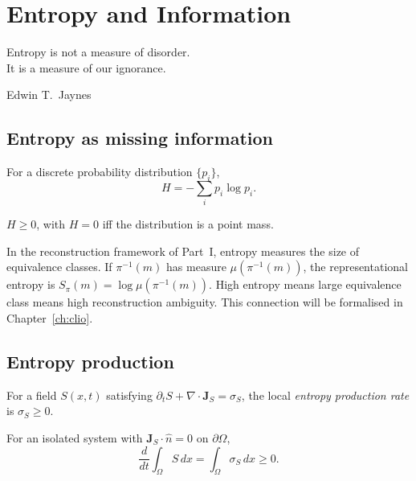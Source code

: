 
\chapter{Entropy and Information}
\label{ch:entropy}

\epigraph{%
  Entropy is not a measure of disorder.\\
  It is a measure of our ignorance.%
}{Edwin T.\ Jaynes}

\section{Entropy as missing information}

\begin{definition}
  For a discrete probability distribution $\{p_i\}$,
  \[
    H = -\sum_i p_i \log p_i.
  \]
\end{definition}

\begin{proposition}
  $H \geq 0$, with $H = 0$ iff the distribution is a point mass.
\end{proposition}

\begin{TechNote}
  In the reconstruction framework of Part~I, entropy measures
  the size of equivalence classes.
  If $\pi^{-1}(m)$ has measure $\mu(\pi^{-1}(m))$, the
  representational entropy is
  $S_\pi(m) = \log \mu(\pi^{-1}(m))$.
  High entropy means large equivalence class means high
  reconstruction ambiguity.
  This connection will be formalised in Chapter~\ref{ch:clio}.
\end{TechNote}

\section{Entropy production}

\begin{definition}
  For a field $S(x,t)$ satisfying
  $\partial_t S + \nabla \cdot \mathbf{J}_S = \sigma_S$,
  the local \emph{entropy production rate} is $\sigma_S \geq 0$.
\end{definition}

\begin{proposition}
  For an isolated system with $\mathbf{J}_S \cdot \hat{n} = 0$
  on $\partial\Omega$,
  \[
    \frac{d}{dt}\int_\Omega S\, dx
    = \int_\Omega \sigma_S\, dx \geq 0.
  \]
\end{proposition}

